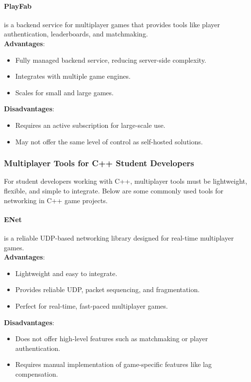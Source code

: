 \documentclass{article} %
\begin{document}
\paragraph{PlayFab} is a backend service for multiplayer games that provides tools like player authentication, leaderboards, and matchmaking.
\\
\textbf{Advantages}:
\begin{itemize}
	\item Fully managed backend service, reducing server-side complexity.
	\item Integrates with multiple game engines.
	\item Scales for small and large games.
\end{itemize}
\textbf{Disadvantages}:
\begin{itemize}
	\item Requires an active subscription for large-scale use.
	\item May not offer the same level of control as self-hosted solutions.
\end{itemize}

\subsubsection{Multiplayer Tools for C++ Student Developers}
For student developers working with C++,
multiplayer tools must be lightweight, flexible, and simple to integrate.
Below are some commonly used tools for networking in C++ game projects.

\paragraph{ENet} is a reliable UDP-based networking library designed for real-time multiplayer games.
\\
\textbf{Advantages}:
\begin{itemize}
	\item Lightweight and easy to integrate.
	\item Provides reliable UDP, packet sequencing, and fragmentation.
	\item Perfect for real-time, fast-paced multiplayer games.
\end{itemize}
\textbf{Disadvantages}:
\begin{itemize}
	\item Does not offer high-level features such as matchmaking or player authentication.
	\item Requires manual implementation of game-specific features like lag compensation.
\end{itemize}
\end{document}
